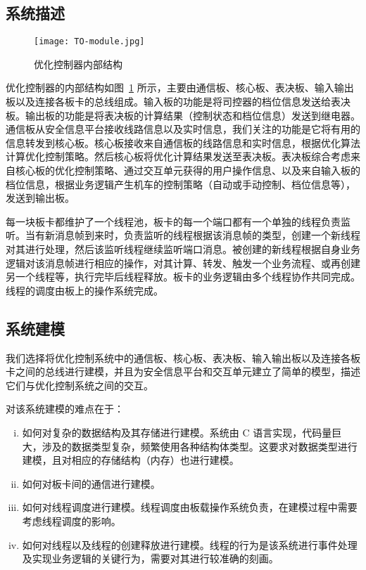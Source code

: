 \subsection{系统描述}

\begin{figure}
\centering
\texttt{[image: TO-module.jpg]}
\caption{优化控制器内部结构}
\label{f:TO-module}
\end{figure}

优化控制器的内部结构如图~\ref{f:TO-module} 所示，主要由通信板、核心板、表决板、输入输出板以及连接各板卡的总线组成。输入板的功能是将司控器的档位信息发送给表决板。输出板的功能是将表决板的计算结果（控制状态和档位信息）发送到继电器。通信板从安全信息平台接收线路信息以及实时信息，我们关注的功能是它将有用的信息转发到核心板。核心板接收来自通信板的线路信息和实时信息，根据优化算法计算优化控制策略。然后核心板将优化计算结果发送至表决板。表决板综合考虑来自核心板的优化控制策略、通过交互单元获得的用户操作信息、以及来自输入板的档位信息，根据业务逻辑产生机车的控制策略（自动或手动控制、档位信息等），发送到输出板。

每一块板卡都维护了一个线程池，板卡的每一个端口都有一个单独的线程负责监听。当有新消息帧到来时，负责监听的线程根据该消息帧的类型，创建一个新线程对其进行处理，然后该监听线程继续监听端口消息。被创建的新线程根据自身业务逻辑对该消息帧进行相应的操作，对其计算、转发、触发一个业务流程、或再创建另一个线程等，执行完毕后线程释放。板卡的业务逻辑由多个线程协作共同完成。线程的调度由板上的操作系统完成。


\subsection{系统建模}

我们选择将优化控制系统中的通信板、核心板、表决板、输入输出板以及连接各板卡之间的总线进行建模，并且为安全信息平台和交互单元建立了简单的模型，描述它们与优化控制系统之间的交互。

对该系统建模的难点在于：
\begin{enumerate} [(i)]
\item 如何对复杂的数据结构及其存储进行建模。系统由 C 语言实现，代码量巨大，涉及的数据类型复杂，频繁使用各种结构体类型。这要求对数据类型进行建模，且对相应的存储结构（内存）也进行建模。
\item 如何对板卡间的通信进行建模。
\item 如何对线程调度进行建模。线程调度由板载操作系统负责，在建模过程中需要考虑线程调度的影响。
\item 如何对线程以及线程的创建释放进行建模。线程的行为是该系统进行事件处理及实现业务逻辑的关键行为，需要对其进行较准确的刻画。
\end{enumerate}

